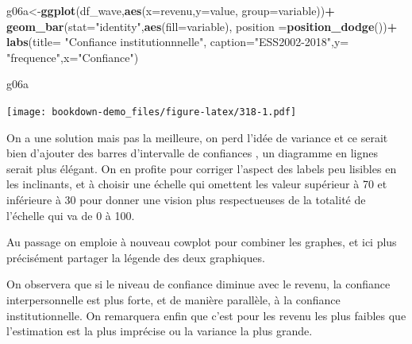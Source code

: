 \documentclass[
]{book}
\newenvironment{Shaded}{\begin{snugshade}}{\end{snugshade}}
\newcommand{\DataTypeTok}[1]{\textcolor[rgb]{0.13,0.29,0.53}{#1}}
\newcommand{\KeywordTok}[1]{\textcolor[rgb]{0.13,0.29,0.53}{\textbf{#1}}}
\newcommand{\NormalTok}[1]{#1}
\newcommand{\OperatorTok}[1]{\textcolor[rgb]{0.81,0.36,0.00}{\textbf{#1}}}
\newcommand{\StringTok}[1]{\textcolor[rgb]{0.31,0.60,0.02}{#1}}
\begin{document}
\begin{Shaded}
\begin{Highlighting}[]
\NormalTok{g06a<-}\KeywordTok{ggplot}\NormalTok{(df_wave,}\KeywordTok{aes}\NormalTok{(}\DataTypeTok{x=}\NormalTok{revenu,}\DataTypeTok{y=}\NormalTok{value, }\DataTypeTok{group=}\NormalTok{variable))}\OperatorTok{+}
\StringTok{  }\KeywordTok{geom_bar}\NormalTok{(}\DataTypeTok{stat=}\StringTok{"identity"}\NormalTok{,}\KeywordTok{aes}\NormalTok{(}\DataTypeTok{fill=}\NormalTok{variable), }\DataTypeTok{position =}\KeywordTok{position_dodge}\NormalTok{())}\OperatorTok{+}\StringTok{  }
\StringTok{  }\KeywordTok{labs}\NormalTok{(}\DataTypeTok{title=} \StringTok{"Confiance institutionnnelle"}\NormalTok{, }\DataTypeTok{caption=}\StringTok{"ESS2002-2018"}\NormalTok{,}\DataTypeTok{y=} \StringTok{"frequence"}\NormalTok{,}\DataTypeTok{x=}\StringTok{"Confiance"}\NormalTok{)}

\NormalTok{g06a}
\end{Highlighting}
\end{Shaded}

\texttt{[image: bookdown-demo\_files/figure-latex/318-1.pdf]}

On a une solution mais pas la meilleure, on perd l'idée de variance et ce serait bien d'ajouter des barres d'intervalle de confiances , un diagramme en lignes serait plus élégant. On en profite pour corriger l'aspect des labels peu lisibles en les inclinants, et à choisir une échelle qui omettent les valeur supérieur à 70 et inférieure à 30 pour donner une vision plus respectueuses de la totalité de l'échelle qui va de 0 à 100.

Au passage on emploie à nouveau cowplot pour combiner les graphes, et ici plus précisément partager la légende des deux graphiques.

On observera que si le niveau de confiance diminue avec le revenu, la confiance interpersonnelle est plus forte, et de manière parallèle, à la confiance institutionnelle. On remarquera enfin que c'est pour les revenu les plus faibles que l'estimation est la plus imprécise ou la variance la plus grande.
\end{document}
